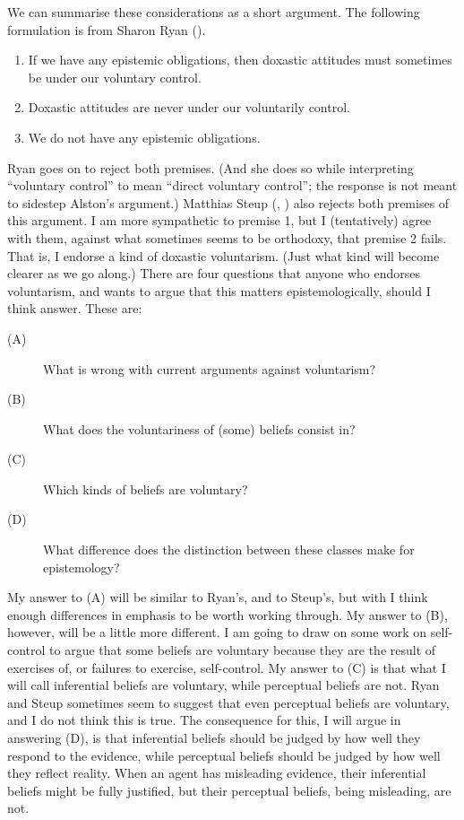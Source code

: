 \documentclass[
  11pt,
  letterpaper,
  DIV=11,
  numbers=noendperiod,
  oneside]{scrartcl}
\providecommand{\tightlist}{%
  \setlength{\itemsep}{0pt}\setlength{\parskip}{0pt}}\usepackage{longtable,booktabs,array}
\begin{document}
We can summarise these considerations as a short argument. The following
formulation is from Sharon Ryan ().

\begin{enumerate}
\def\labelenumi{\arabic{enumi}.}
\tightlist
\item
  If we have any epistemic obligations, then doxastic attitudes must
  sometimes be under our voluntary control.
\item
  Doxastic attitudes are never under our voluntarily control.
\item
  We do not have any epistemic obligations.
\end{enumerate}

Ryan goes on to reject both premises. (And she does so while
interpreting ``voluntary control'' to mean ``direct voluntary control'';
the response is not meant to sidestep Alston's argument.) Matthias Steup
(, ) also
rejects both premises of this argument. I am more sympathetic to premise
1, but I (tentatively) agree with them, against what sometimes seems to
be orthodoxy, that premise 2 fails. That is, I endorse a kind of
doxastic voluntarism. (Just what kind will become clearer as we go
along.) There are four questions that anyone who endorses voluntarism,
and wants to argue that this matters epistemologically, should I think
answer. These are:

\begin{description}
\item[(A)]
What is wrong with current arguments against voluntarism?
\item[(B)]
What does the voluntariness of (some) beliefs consist in?
\item[(C)]
Which kinds of beliefs are voluntary?
\item[(D)]
What difference does the distinction between these classes make for
epistemology?
\end{description}

My answer to (A) will be similar to Ryan's, and to Steup's, but with I
think enough differences in emphasis to be worth working through. My
answer to (B), however, will be a little more different. I am going to
draw on some work on self-control to argue that some beliefs are
voluntary because they are the result of exercises of, or failures to
exercise, self-control. My answer to (C) is that what I will call
inferential beliefs are voluntary, while perceptual beliefs are not.
Ryan and Steup sometimes seem to suggest that even perceptual beliefs
are voluntary, and I do not think this is true. The consequence for
this, I will argue in answering (D), is that inferential beliefs should
be judged by how well they respond to the evidence, while perceptual
beliefs should be judged by how well they reflect reality. When an agent
has misleading evidence, their inferential beliefs might be fully
justified, but their perceptual beliefs, being misleading, are not.
\end{document}
